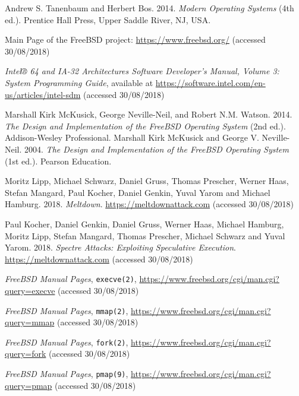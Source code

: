 \documentclass[shortabstract, english]{iithesis}
\begin{document}
\begin{thebibliography}{99}

 Andrew S. Tanenbaum and Herbert Bos. 2014.
  \textit{Modern Operating Systems} (4th ed.). Prentice Hall Press, Upper Saddle
  River, NJ, USA.

 Main Page of the FreeBSD project:
  \url{https://www.freebsd.org/} (accessed 30/08/2018)

 \textit{Intel® 64 and IA-32 Architectures Software
    Developer’s Manual, Volume 3: System Programming Guide}, available at
  \url{https://software.intel.com/en-us/articles/intel-sdm} (accessed
  30/08/2018)

 Marshall Kirk McKusick, George Neville-Neil, and Robert
  N.M. Watson. 2014. \textit{The Design and Implementation of the FreeBSD
    Operating System} (2nd ed.). Addison-Wesley Professional.
 Marshall Kirk McKusick and George V. Neville-Neil.
  2004. \textit{The Design and Implementation of the FreeBSD Operating System}
  (1st ed.). Pearson Education.

 Moritz Lipp, Michael Schwarz, Daniel Gruss, Thomas
  Prescher, Werner Haas, Stefan Mangard, Paul Kocher, Daniel Genkin, Yuval Yarom
  and Michael Hamburg. 2018. \textit{Meltdown}. \url{https://meltdownattack.com}
  (accessed 30/08/2018)

 Paul Kocher, Daniel Genkin, Daniel Gruss, Werner Haas,
  Michael Hamburg, Moritz Lipp, Stefan Mangard, Thomas Prescher, Michael Schwarz
  and Yuval Yarom. 2018. \textit{Spectre Attacks: Exploiting Speculative
    Execution}. \url{https://meltdownattack.com} (accessed 30/08/2018)

 \textit{FreeBSD Manual Pages}, \texttt{execve(2)},
  \url{https://www.freebsd.org/cgi/man.cgi?query=execve} (accessed 30/08/2018)

 \textit{FreeBSD Manual Pages}, \texttt{mmap(2)},
  \url{https://www.freebsd.org/cgi/man.cgi?query=mmap} (accessed 30/08/2018)

 \textit{FreeBSD Manual Pages}, \texttt{fork(2)},
  \url{https://www.freebsd.org/cgi/man.cgi?query=fork} (accessed 30/08/2018)

 \textit{FreeBSD Manual Pages}, \texttt{pmap(9)},
  \url{https://www.freebsd.org/cgi/man.cgi?query=pmap} (accessed 30/08/2018)

\end{thebibliography}
\end{document}

